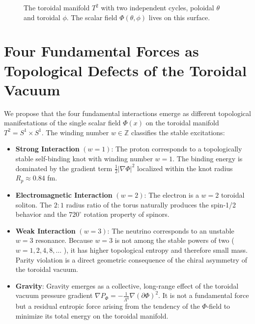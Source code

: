 \documentclass[11pt,a4paper]{article}
\begin{document}
\begin{figure}[H]
\centering
{}
\caption{The toroidal manifold \(T^2\) with two independent cycles, poloidal \(\theta\) and toroidal \(\phi\). The scalar field \(\Phi(\theta,\phi)\) lives on this surface.}
\end{figure}

\section{Four Fundamental Forces as Topological Defects of the Toroidal Vacuum}
We propose that the four fundamental interactions emerge as different topological manifestations of the single scalar field \(\Phi (x)\) on the toroidal manifold \(T^2 = S^1 \times S^1\). The winding number \(w \in \mathbb{Z}\) classifies the stable excitations:

\begin{itemize}
\item \textbf{Strong Interaction} \((w = 1)\): The proton corresponds to a topologically stable self-binding knot with winding number \(w = 1\). The binding energy is dominated by the gradient term \(\frac{1}{2} |\nabla \Phi |^2\) localized within the knot radius \(R_p \approx 0.84\) fm.
\item \textbf{Electromagnetic Interaction} \((w = 2)\): The electron is a \(w = 2\) toroidal soliton. The \(2:1\) radius ratio of the torus naturally produces the spin-1/2 behavior and the \(720^{\circ}\) rotation property of spinors.
\item \textbf{Weak Interaction} \((w = 3)\): The neutrino corresponds to an unstable \(w = 3\) resonance. Because \(w = 3\) is not among the stable powers of two ( \(w = 1,2,4,8,\ldots\) ), it has higher topological entropy and therefore small mass. Parity violation is a direct geometric consequence of the chiral asymmetry of the toroidal vacuum.
\item \textbf{Gravity}: Gravity emerges as a collective, long-range effect of the toroidal vacuum pressure gradient \(\nabla P_{\Phi} = - \frac{1}{\Lambda^{4}}\nabla (\partial \Phi)^{2}\). It is not a fundamental force but a residual entropic force arising from the tendency of the \(\Phi\)-field to minimize its total energy on the toroidal manifold.
\end{itemize}
\end{document}
